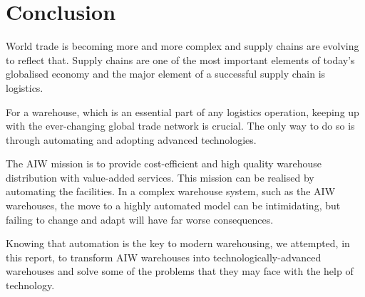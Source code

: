 \documentclass{report}
\begin{document}
\section{Conclusion}

World trade is becoming more and more complex and supply chains are evolving to reflect that. Supply chains are one of the most important elements of today’s globalised economy and the major element of a successful supply chain is logistics. 

For a warehouse, which is an essential part of any logistics operation, keeping up with the ever-changing global trade network is crucial. The only way to do so is through automating and adopting advanced technologies.

 The AIW mission is to provide cost-efficient and high quality warehouse distribution with value-added services. This mission can be realised by automating the facilities. In a complex warehouse system, such as the AIW warehouses, the move to a highly automated model can be intimidating, but failing to change and adapt will have far worse consequences.

Knowing that automation is the key to modern warehousing, we attempted, in this report, to transform AIW warehouses into technologically-advanced warehouses and solve some of the problems that they may face with the help of technology. 

\printbibliography
\end{document}
